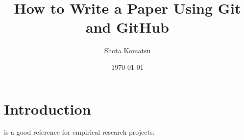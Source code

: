 \documentclass{article}
\title{How to Write a Paper Using Git and GitHub}
\author{Shota Komatsu}
\date{\today}
\begin{document}
\maketitle

\section{Introduction}

\citet{knittel2018working} is a good reference for empirical research projects.



\end{document}
